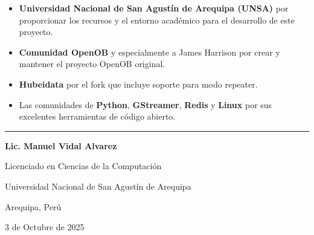 \documentclass[12pt,a4paper]{article}
\begin{document}
\begin{itemize}
    \item \textbf{Universidad Nacional de San Agustín de Arequipa (UNSA)} por proporcionar los recursos y el entorno académico para el desarrollo de este proyecto.
    
    \item \textbf{Comunidad OpenOB} y especialmente a James Harrison por crear y mantener el proyecto OpenOB original.
    
    \item \textbf{Hubeidata} por el fork que incluye soporte para modo repeater.
    
    \item Las comunidades de \textbf{Python}, \textbf{GStreamer}, \textbf{Redis} y \textbf{Linux} por sus excelentes herramientas de código abierto.
\end{itemize}

\vspace{2cm}

\begin{center}
\rule{0.5\textwidth}{0.4pt}

\textbf{Lic. Manuel Vidal Alvarez}

Licenciado en Ciencias de la Computación

Universidad Nacional de San Agustín de Arequipa

Arequipa, Perú

3 de Octubre de 2025
\end{center}
\end{document}
